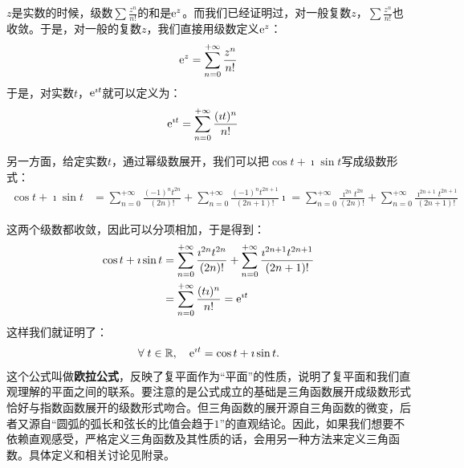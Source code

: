 \documentclass[12pt,UTF8]{ctexbook}
\begin{document}
$z$是实数的时候，级数$\sum \frac{z^{n}}{n!}$的和是$\mathrm{e}^{z}$。而我们已经证明过，对一般复数$z$，$\sum \frac{z^{n}}{n!}$也收敛。于是，对一般的复数$z$，我们直接用级数定义$\mathrm{e}^z$：
$$ \mathrm{e}^{z} = \sum_{n=0}^{+\infty} \frac{z^{n}}{n!} $$
于是，对实数$t$，$\mathrm{e}^{\imath t}$就可以定义为：
\begin{align*}
    \mathrm{e}^{\imath t} &= \sum_{n=0}^{+\infty} \frac{(\imath t)^{n}}{n!}
\end{align*}

另一方面，给定实数$t$，通过幂级数展开，我们可以把$\cos{t} + \imath \sin{t}$写成级数形式：
\begin{align*}
    \cos{t} + \imath \sin{t} &= \sum_{n=0}^{+\infty} \frac{(-1)^nt^{2n}}{(2n)!} + \sum_{n=0}^{+\infty} \frac{(-1)^nt^{2n+1}}{(2n+1)!}\imath = \sum_{n=0}^{+\infty} \frac{\imath^{2n}t^{2n}}{(2n)!} + \sum_{n=0}^{+\infty} \frac{\imath^{2n+1}t^{2n+1}}{(2n+1)!}
\end{align*}

这两个级数都收敛，因此可以分项相加，于是得到：
\begin{align*}
    \cos{t} + \imath \sin{t} &= \sum_{n=0}^{+\infty} \frac{\imath^{2n}t^{2n}}{(2n)!} + \sum_{n=0}^{+\infty} \frac{\imath^{2n+1}t^{2n+1}}{(2n+1)!} \\
    &= \sum_{n=0}^{+\infty} \frac{(t\imath)^{n}}{n!} = \mathrm{e}^{\imath t}
\end{align*}
这样我们就证明了：
$$ \forall \; t\in\mathbb{R}, \quad \mathrm{e}^{\imath t} = \cos{t} + \imath \sin{t}. $$
这个公式叫做\textbf{欧拉公式}，反映了复平面作为“平面”的性质，说明了复平面和我们直观理解的平面之间的联系。要注意的是公式成立的基础是三角函数展开成级数形式恰好与指数函数展开的级数形式吻合。但三角函数的展开源自三角函数的微变，后者又源自“圆弧的弧长和弦长的比值会趋于$1$”的直观结论。因此，如果我们想要不依赖直观感受，严格定义三角函数及其性质的话，会用另一种方法来定义三角函数。具体定义和相关讨论见附录。
\end{document}
